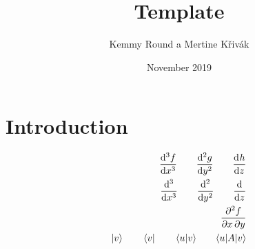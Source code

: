 \documentclass[12pt,a4paper,twoside,openright]{report}
\title{Template}
\author{Kemmy Round a Mertine Křivák}
\date{November 2019}
\begin{document}
\maketitle

\section{Introduction}


\lipsum[1]

\begin{align*}
    \nder 3 f x \qquad \dder g y \qquad \der hz
\\ 
    \vnder 3 x \qquad \vdder y \qquad \vder z
\\
    \ppder f x y
\\
    \ket v \qquad \bra v \qquad \bracket u v \qquad \braopket u A v
\end{align*}
\end{document}
